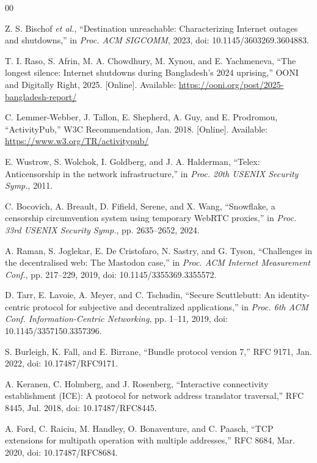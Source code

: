 \documentclass[conference,a4paper]{IEEEtran}
\begin{document}
\begin{thebibliography}{00}

Z. S. Bischof \emph{et al.}, ``Destination unreachable: Characterizing Internet outages and
shutdowns,'' in \emph{Proc. ACM SIGCOMM}, 2023, doi: 10.1145/3603269.3604883.

T. I. Raso, S. Afrin, M. A. Chowdhury, M. Xynou, and E. Yachmeneva, ``The longest silence:
Internet shutdowns during Bangladesh's 2024 uprising,'' OONI and Digitally Right, 2025. [Online].
Available: \url{https://ooni.org/post/2025-bangladesh-report/}

C. Lemmer-Webber, J. Tallon, E. Shepherd, A. Guy, and E. Prodromou, ``ActivityPub,'' W3C
Recommendation, Jan. 2018. [Online]. Available: \url{https://www.w3.org/TR/activitypub/}

E. Wustrow, S. Wolchok, I. Goldberg, and J. A. Halderman, ``Telex: Anticensorship in the network
infrastructure,'' in \emph{Proc. 20th USENIX Security Symp.}, 2011.

C. Bocovich, A. Breault, D. Fifield, Serene, and X. Wang, ``Snowflake, a censorship circumvention
system using temporary WebRTC proxies,'' in \emph{Proc. 33rd USENIX Security Symp.}, pp. 2635--2652,
2024.

A. Raman, S. Joglekar, E. De Cristofaro, N. Sastry, and G. Tyson, ``Challenges in the decentralised
web: The Mastodon case,'' in \emph{Proc. ACM Internet Measurement Conf.}, pp. 217--229, 2019, doi:
10.1145/3355369.3355572.

D. Tarr, E. Lavoie, A. Meyer, and C. Tschudin, ``Secure Scuttlebutt: An identity-centric protocol
for subjective and decentralized applications,'' in \emph{Proc. 6th ACM Conf. Information-Centric
Networking}, pp. 1--11, 2019, doi: 10.1145/3357150.3357396.

S. Burleigh, K. Fall, and E. Birrane, ``Bundle protocol version 7,'' RFC 9171, Jan. 2022, doi:
10.17487/RFC9171.

A. Keranen, C. Holmberg, and J. Rosenberg, ``Interactive connectivity establishment (ICE): A
protocol for network address translator traversal,'' RFC 8445, Jul. 2018, doi: 10.17487/RFC8445.

A. Ford, C. Raiciu, M. Handley, O. Bonaventure, and C. Paasch, ``TCP extensions for multipath
operation with multiple addresses,'' RFC 8684, Mar. 2020, doi: 10.17487/RFC8684.


\end{thebibliography}
\end{document}

